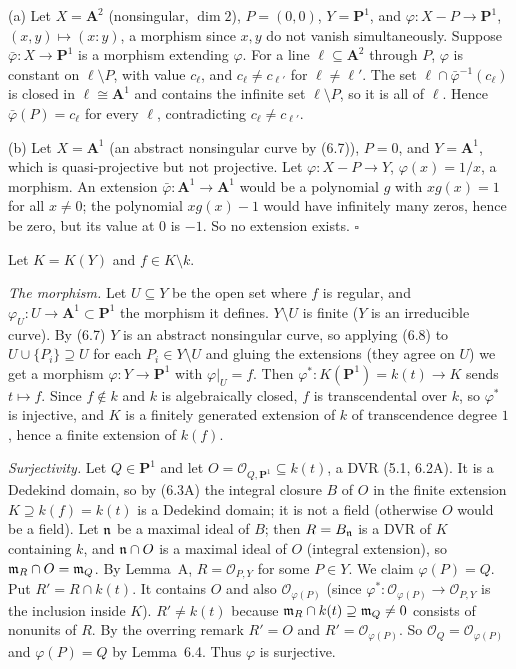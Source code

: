 \documentclass[11pt]{article}
\begin{document}
(a) Let $X=\mathbf A^2$ (nonsingular, $\dim 2$), $P=(0,0)$, $Y=\mathbf P^1$, and $\varphi:X-P\to\mathbf P^1$, $(x,y)\mapsto(x:y)$, a morphism since $x,y$ do not vanish simultaneously. Suppose $\bar\varphi:X\to\mathbf P^1$ is a morphism extending $\varphi$. For a line $\ell\subseteq\mathbf A^2$ through $P$, $\varphi$ is constant on $\ell\setminus P$, with value $c_\ell$, and $c_\ell\ne c_{\ell'}$ for $\ell\ne\ell'$. The set $\ell\cap\bar\varphi^{-1}(c_\ell)$ is closed in $\ell\cong\mathbf A^1$ and contains the infinite set $\ell\setminus P$, so it is all of $\ell$. Hence $\bar\varphi(P)=c_\ell$ for every $\ell$, contradicting $c_\ell\neq c_{\ell'}$.

(b) Let $X=\mathbf A^1$ (an abstract nonsingular curve by (6.7)), $P=0$, and $Y=\mathbf A^1$, which is quasi-projective but not projective. Let $\varphi:X-P\to Y$, $\varphi(x)=1/x$, a morphism. An extension $\bar\varphi:\mathbf A^1\to\mathbf A^1$ would be a polynomial $g$ with $xg(x)=1$ for all $x\ne0$; the polynomial $xg(x)-1$ would have infinitely many zeros, hence be zero, but its value at $0$ is $-1$. So no extension exists. \hfill$\square$

\pf
Let $K=K(Y)$ and $f\in K\setminus k$.

\emph{The morphism.} Let $U\subseteq Y$ be the open set where $f$ is regular, and $\varphi_U:U\to\mathbf A^1\subset\mathbf P^1$ the morphism it defines. $Y\setminus U$ is finite ($Y$ is an irreducible curve). By (6.7) $Y$ is an abstract nonsingular curve, so applying (6.8) to $U\cup\{P_i\}\supseteq U$ for each $P_i\in Y\setminus U$ and gluing the extensions (they agree on $U$) we get a morphism $\varphi:Y\to\mathbf P^1$ with $\varphi|_U=f$. Then $\varphi^*:K(\mathbf P^1)=k(t)\to K$ sends $t\mapsto f$. Since $f\notin k$ and $k$ is algebraically closed, $f$ is transcendental over $k$, so $\varphi^*$ is injective, and $K$ is a finitely generated extension of $k$ of transcendence degree $1$, hence a finite extension of $k(f)$.

\emph{Surjectivity.} Let $Q\in\mathbf P^1$ and let $O=\mathcal O_{Q,\mathbf P^1}\subseteq k(t)$, a DVR (5.1, 6.2A). It is a Dedekind domain, so by (6.3A) the integral closure $B$ of $O$ in the finite extension $K\supseteq k(f)=k(t)$ is a Dedekind domain; it is not a field (otherwise $O$ would be a field). Let $\mathfrak n$ be a maximal ideal of $B$; then $R=B_\mathfrak n$ is a DVR of $K$ containing $k$, and $\mathfrak n\cap O$ is a maximal ideal of $O$ (integral extension), so $\mathfrak m_R\cap O=\mathfrak m_Q$. By Lemma~A, $R=\mathcal O_{P,Y}$ for some $P\in Y$. We claim $\varphi(P)=Q$. Put $R'=R\cap k(t)$. It contains $O$ and also $\mathcal O_{\varphi(P)}$ (since $\varphi^*:\mathcal O_{\varphi(P)}\to\mathcal O_{P,Y}$ is the inclusion inside $K$). $R'\ne k(t)$ because $\mathfrak m_R\cap k(t)\supseteq\mathfrak m_Q\ne0$ consists of nonunits of $R$. By the overring remark $R'=O$ and $R'=\mathcal O_{\varphi(P)}$. So $\mathcal O_Q=\mathcal O_{\varphi(P)}$ and $\varphi(P)=Q$ by Lemma~6.4. Thus $\varphi$ is surjective.
\end{document}
